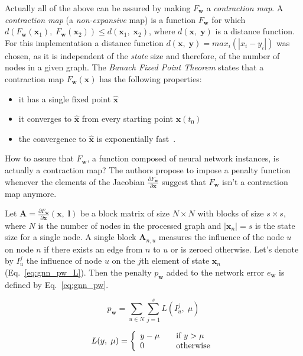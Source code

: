 Actually all of the above can be assured by making $F_{\bm{w}}$ a \emph{contraction map}. A \emph{contraction map} (a \emph{non-expansive} map) is a function $F_{\bm{w}}$ for which $d(F_{\bm{w}}(\bm{x}_1), \; F_{\bm{w}}(\bm{x}_2)) \leq d(\bm{x}_1, \; \bm{x}_2)$, where $d(\bm{x}, \; \bm{y})$ is a distance function. For this implementation a distance function $d(\bm{x}, \; \bm{y}) = max_i(|x_{i} - y_{i}|)$ was chosen, as it is independent of the \emph{state} size and therefore, of the number of nodes in a given graph. The \emph{Banach Fixed Point Theorem} states that a contraction map $F_{\bm{w}}(\bm{x})$ has the following properties:
\begin{itemize}
	\item it has a single fixed point $\hat{\bm{x}}$
	\item it converges to $\hat{\bm{x}}$ from every starting point $\bm{x}(t_0)$
	\item the convergence to  $\hat{\bm{x}}$ is exponentially fast~\cite{scarselli2009graph}.
\end{itemize}

\noindent How to assure that $F_{\bm{w}}$, a function composed of neural network instances, is actually a contraction map? The authors propose to impose a penalty function whenever the elements of the Jacobian $\frac{\partial F_{\bm{w}}}{\partial \bm{x}}$ suggest that $F_{\bm{w}}$ isn't a contraction map anymore.

Let $\bm{A} = \frac{\partial F_{\bm{w}}}{\partial \bm{x}}(\bm{x}, \; \bm{l})$ be a block matrix of size $N \times N$ with blocks of size $s \times s$, where $N$ is the number of nodes in the processed graph and $|\bm{x}_n| = s$ is the state size for a single node. A single block $\bm{A}_{n,u}$ measures the influence of the node $u$ on node $n$ if there exists an edge from $n$ to $u$ or is zeroed otherwise. Let's denote by $I_u^j$ the influence of node $u$ on the $j$th element of state $\bm{x}_n$ (Eq.~\ref{eq:gnn_pw_L}). Then the penalty $p_{\bm{w}}$ added to the network error $e_{\bm{w}}$ is defined by Eq.~\ref{eq:gnn_pw}.

\begin{equation}
p_{\bm{w}} = \sum_{u \in N} \sum_{j = 1}^{s} L(I_u^j, \; \mu)
\label{eq:gnn_pw}
\end{equation}

\begin{equation}
L(y, \; \mu) = \left\{
\begin{array}{l l}
	y - \mu		& \quad \text{if $y > \mu$} \\
	0			& \quad \text{otherwise}
\end{array} \right.
\label{eq:gnn_pw_L}
\end{equation}

